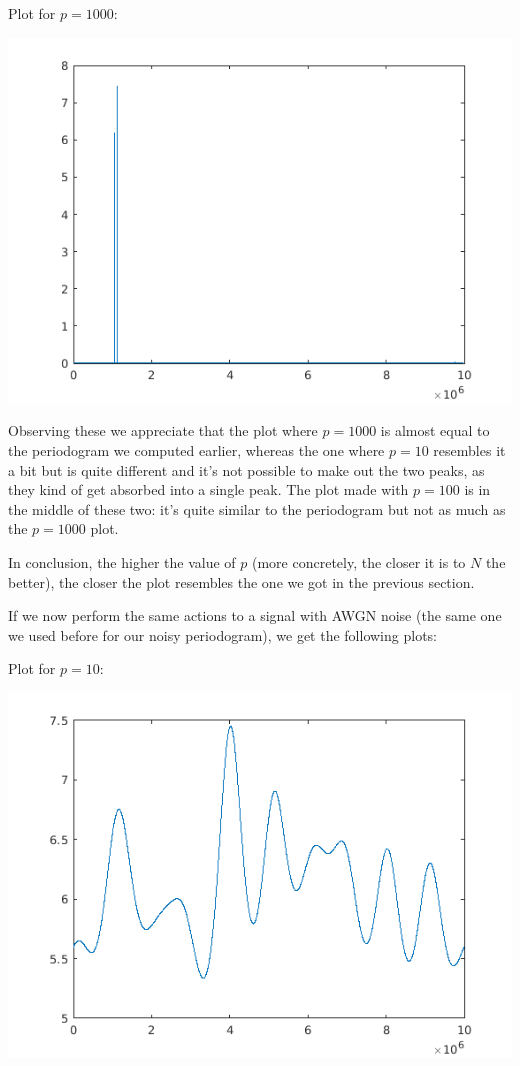 \documentclass[conference,9pt]{IEEEtran}
\begin{document}
Plot for $p=1000$:

\includegraphics[scale=0.6]{p1000}

Observing these we appreciate that the plot where $p=1000$ is almost equal to the periodogram we computed earlier, whereas the one where $p=10$ resembles it a bit but is quite different and it's not possible to make out the two peaks, as they kind of get absorbed into a single peak. The plot made with $p=100$ is in the middle of these two: it's quite similar to the periodogram but not as much as the $p=1000$ plot.

In conclusion, the higher the value of $p$ (more concretely, the closer it is to $N$ the better), the closer the plot resembles the one we got in the previous section. 

If we now perform the same actions to a signal with AWGN noise (the same one we used before for our noisy periodogram), we get the following plots:

Plot for $p=10$:

\includegraphics[scale=0.6]{pn10}
\end{document}

